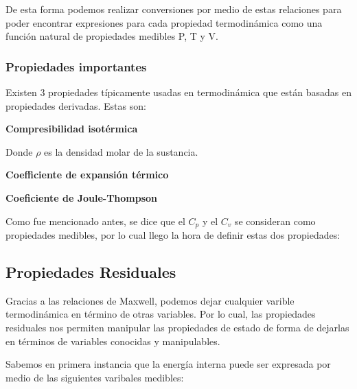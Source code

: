 De esta forma podemos realizar conversiones por medio de estas relaciones para poder encontrar expresiones para cada propiedad termodinámica como una función natural de propiedades medibles P, T y V.

\subsubsection{Propiedades importantes}

Existen 3 propiedades típicamente usadas en termodinámica que están basadas en propiedades derivadas. Estas son:

\break

\textbf{Compresibilidad isotérmica}


Donde $\rho$ es la densidad molar de la sustancia.

\textbf{Coefficiente de expansión térmico}


\textbf{Coeficiente de Joule-Thompson}


Como fue mencionado antes, se dice que el $C_p$ y el $C_v$ se consideran como propiedades medibles, por lo cual llego la hora de definir estas dos propiedades:


\subsection{Propiedades Residuales}

Gracias a las relaciones de Maxwell, podemos dejar cualquier varible termodinámica en término de otras variables. Por lo cual, las propiedades residuales nos permiten manipular las propiedades de estado de forma de dejarlas en términos de variables conocidas y manipulables.

Sabemos en primera instancia que la energía interna puede ser expresada por medio de las siguientes varibales medibles:

